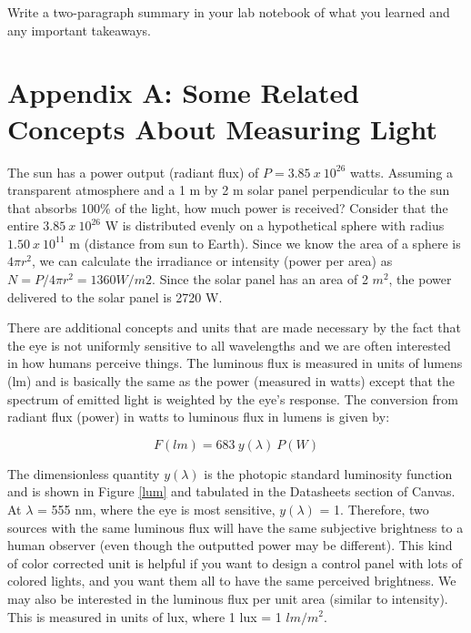 \documentclass[10pt]{PhysLab1C} %
\begin{document}
Write a two-paragraph summary in your lab notebook of what you learned
and any important takeaways.


\section*{Appendix A: Some Related Concepts About Measuring Light}


The sun has a power output (radiant flux) of $P = 3.85~x~10^{26}$ watts. Assuming a transparent atmosphere and a 1
m by 2 m solar panel perpendicular to the sun that absorbs 100\%  of the light, how much power is received?
Consider that the entire $3.85~x~10^{26}$ W is distributed evenly on a hypothetical sphere with radius $1.50~x~10^{11}$ m
(distance from sun to Earth). Since we know the area of a sphere is $4\pi r^2$, we can calculate the irradiance or
intensity (power per area) as $N = P/4\pi r^2 = 1360 W/m2$. Since the solar panel has an area of 2 $m^2$, the power
delivered to the solar panel is 2720 W.

There are additional concepts and units that are made necessary by the fact that the eye is not uniformly
sensitive to all wavelengths and we are often interested in how humans perceive things. The luminous flux is
measured in units of lumens (lm) and is basically the same as the power (measured in watts) except that the
spectrum of emitted light is weighted by the eye’s response. The conversion from radiant flux (power) in watts
to luminous flux in lumens is given by:

$$F(lm) = 683 ~y(\lambda)~P(W)$$

The dimensionless quantity $y(\lambda)$ is the photopic standard
luminosity function and is shown in Figure \ref{lum} and tabulated in the
Datasheets section of Canvas. At $\lambda$ = 555 nm, where the eye is
most sensitive, $y(\lambda)$ = 1. Therefore, two sources with the same
luminous flux will have the same subjective brightness to a human
observer (even though the outputted power may be different).
This kind of color corrected unit is helpful if you want to design a
control panel with lots of colored lights, and you want them all to
have the same perceived brightness. We may also be interested
in the luminous flux per unit area (similar to intensity). This is
measured in units of lux, where 1 lux = 1 $lm/m^2$.
\end{document}
